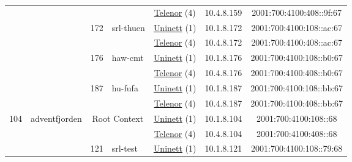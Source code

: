 \begin{small}
\begin{center}
\begin{longtable}{|c|c|c|c|c|c|c|c|}
  &  &  &  & \multicolumn{2}{|c|}{\tiny{\href{https://www.telenor.no}{Telenor} (4)}} & \tiny{10.4.8.159} & \tiny{2001:700:4100:408::9f:67} \\* \cline{3-3}\cline{4-4}\cline{5-5}\cline{6-6}\cline{7-7}\cline{8-8}
  &  & \multirow{2}{*}{\tiny{172}} & \multicolumn{1}{|l|}{\multirow{2}{*}{\tiny{srl-thuen}}} & \multicolumn{2}{|c|}{\tiny{\href{https://www.uninett.no}{Uninett} (1)}} & \tiny{10.1.8.172} & \tiny{2001:700:4100:108::ac:67} \\* \cline{5-5}\cline{6-6}\cline{7-7}\cline{8-8}
  &  &  &  & \multicolumn{2}{|c|}{\tiny{\href{https://www.telenor.no}{Telenor} (4)}} & \tiny{10.4.8.172} & \tiny{2001:700:4100:408::ac:67} \\* \cline{3-3}\cline{4-4}\cline{5-5}\cline{6-6}\cline{7-7}\cline{8-8}
  &  & \multirow{2}{*}{\tiny{176}} & \multicolumn{1}{|l|}{\multirow{2}{*}{\tiny{haw-cmt}}} & \multicolumn{2}{|c|}{\tiny{\href{https://www.uninett.no}{Uninett} (1)}} & \tiny{10.1.8.176} & \tiny{2001:700:4100:108::b0:67} \\* \cline{5-5}\cline{6-6}\cline{7-7}\cline{8-8}
  &  &  &  & \multicolumn{2}{|c|}{\tiny{\href{https://www.telenor.no}{Telenor} (4)}} & \tiny{10.4.8.176} & \tiny{2001:700:4100:408::b0:67} \\* \cline{3-3}\cline{4-4}\cline{5-5}\cline{6-6}\cline{7-7}\cline{8-8}
  &  & \multirow{2}{*}{\tiny{187}} & \multicolumn{1}{|l|}{\multirow{2}{*}{\tiny{hu-fufa}}} & \multicolumn{2}{|c|}{\tiny{\href{https://www.uninett.no}{Uninett} (1)}} & \tiny{10.1.8.187} & \tiny{2001:700:4100:108::bb:67} \\* \cline{5-5}\cline{6-6}\cline{7-7}\cline{8-8}
  &  &  &  & \multicolumn{2}{|c|}{\tiny{\href{https://www.telenor.no}{Telenor} (4)}} & \tiny{10.4.8.187} & \tiny{2001:700:4100:408::bb:67} \\ \hline
 \multirow{30}{*}{\tiny{104}} & \multicolumn{1}{|l|}{\multirow{30}{*}{\tiny{adventfjorden}}} & \multicolumn{2}{|c|}{\multirow{2}{*}{\tiny{Root Context}}} & \multicolumn{2}{|c|}{\tiny{\href{https://www.uninett.no}{Uninett} (1)}} & \tiny{10.1.8.104} & \tiny{2001:700:4100:108::68} \\* \cline{5-5}\cline{6-6}\cline{7-7}\cline{8-8}
  &  & \multicolumn{2}{|c|}{} & \multicolumn{2}{|c|}{\tiny{\href{https://www.telenor.no}{Telenor} (4)}} & \tiny{10.4.8.104} & \tiny{2001:700:4100:408::68} \\* \cline{3-3}\cline{4-4}\cline{5-5}\cline{6-6}\cline{7-7}\cline{8-8}
  &  & \multirow{2}{*}{\tiny{121}} & \multicolumn{1}{|l|}{\multirow{2}{*}{\tiny{srl-test}}} & \multicolumn{2}{|c|}{\tiny{\href{https://www.uninett.no}{Uninett} (1)}} & \tiny{10.1.8.121} & \tiny{2001:700:4100:108::79:68} \\* \cline{5-5}\cline{6-6}\cline{7-7}\cline{8-8}

\end{longtable}
\end{center}
\end{small}
